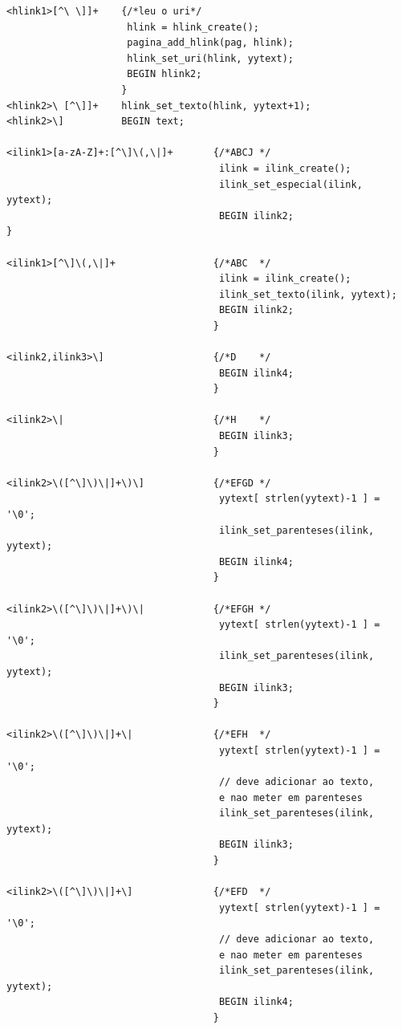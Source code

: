 \documentclass[11pt, a4paper, oneside]{article}
\begin{document}
\begin{verbatim}
<hlink1>[^\ \]]+    {/*leu o uri*/
                     hlink = hlink_create();
                     pagina_add_hlink(pag, hlink);
                     hlink_set_uri(hlink, yytext);
                     BEGIN hlink2;
                    }
<hlink2>\ [^\]]+    hlink_set_texto(hlink, yytext+1);
<hlink2>\]          BEGIN text;

<ilink1>[a-zA-Z]+:[^\]\(,\|]+       {/*ABCJ */
                                     ilink = ilink_create();
                                     ilink_set_especial(ilink, yytext);
                                     BEGIN ilink2;                                    }

<ilink1>[^\]\(,\|]+                 {/*ABC  */
                                     ilink = ilink_create();
                                     ilink_set_texto(ilink, yytext);
                                     BEGIN ilink2;
                                    }

<ilink2,ilink3>\]                   {/*D    */
                                     BEGIN ilink4;
                                    }

<ilink2>\|                          {/*H    */
                                     BEGIN ilink3;
                                    }

<ilink2>\([^\]\)\|]+\)\]            {/*EFGD */
                                     yytext[ strlen(yytext)-1 ] = '\0';
                                     ilink_set_parenteses(ilink, yytext);
                                     BEGIN ilink4;
                                    }

<ilink2>\([^\]\)\|]+\)\|            {/*EFGH */
                                     yytext[ strlen(yytext)-1 ] = '\0';
                                     ilink_set_parenteses(ilink, yytext);
                                     BEGIN ilink3;
                                    }

<ilink2>\([^\]\)\|]+\|              {/*EFH  */
                                     yytext[ strlen(yytext)-1 ] = '\0';
                                     // deve adicionar ao texto, 
                                     e nao meter em parenteses
                                     ilink_set_parenteses(ilink, yytext);
                                     BEGIN ilink3;
                                    }

<ilink2>\([^\]\)\|]+\]              {/*EFD  */
                                     yytext[ strlen(yytext)-1 ] = '\0';
                                     // deve adicionar ao texto, 
                                     e nao meter em parenteses
                                     ilink_set_parenteses(ilink, yytext);
                                     BEGIN ilink4;
                                    }


\end{verbatim}
\end{document}
